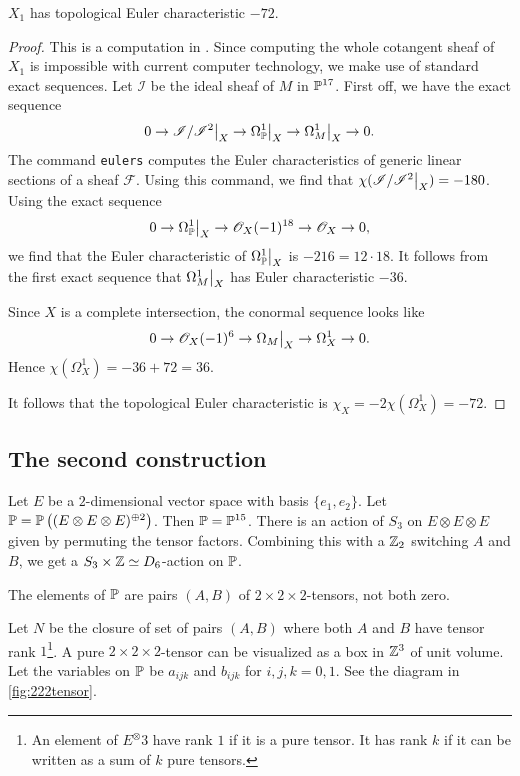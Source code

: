 \begin{proposition}
\label{prop:x1euler}
$X_1$ has topological Euler characteristic $-72$. 
\end{proposition}
\begin{proof}
This is a computation in \MM. Since computing the whole cotangent sheaf of $X_1$ is impossible with current computer technology, we make use of standard exact sequences. Let $\mathscr I$ be the ideal sheaf of $M$ in $\P^{17}$. First off, we have the exact sequence
$$
0 \to \restr{\mathscr I/\mathscr I^2}{X} \to \restr{\Omega_\P^1}{X} \to \restr{\Omega_M^1}{X} \to 0.
$$
The \MM command \texttt{eulers} computes the Euler characteristics of generic linear sections of a sheaf $\mathscr F$. Using this command, we find that $\chi(\restr{\mathscr I/\mathscr I^2}{X})=-180$. Using the exact sequence
$$
0 \to \restr{\Omega_\P^1}{X} \to \OO_X(-1)^{18} \to \OO_X \to 0,
$$
we find that the Euler characteristic of $\restr{\Omega_\P^1}{X}$ is $-216=12\cdot 18$. It follows from the first exact sequence that $\restr{\Omega_M^1}{X}$ has Euler characteristic $-36$.

Since $X$ is a complete intersection, the conormal sequence looks like
$$
0 \to \OO_X(-1)^6 \to \restr{\Omega_M}{X}  \to \Omega_X^1 \to 0.
$$
Hence $\chi(\Omega_X^1) = -36+72 = 36$.

It follows that the topological Euler characteristic is $\chi_X = -2\chi(\Omega_X^1)=-72$.
\end{proof}

\subsection{The second construction}

Let $E$ be a $2$-dimensional vector space with basis $\{e_1,e_2\}$. Let $\P=\P\left((E \otimes E \otimes E)^{\oplus 2}\right)$. Then $\P=\P^{15}$. There is an action of $S_3$ on $E \otimes E \otimes E$ given by permuting the tensor factors. Combining this with a $\Z_2$ switching $A$ and $B$, we get a $S_3 \times \Z \simeq D_6$-action on $\P$. 

The elements of $\P$ are pairs $(A,B)$ of $2 \times 2 \times 2$-tensors, not both zero. 

Let $N$ be the closure of set of pairs $(A,B)$ where both $A$ and $B$ have tensor rank $1$\footnote{An element of $E^\otimes 3$ have rank $1$ if it is a pure tensor. It has rank $k$ if it can be written as a sum of $k$ pure tensors.}. A pure $2 \times 2 \times 2$-tensor can be visualized as a box in $\Z^3$ of unit volume. Let the variables on $\P$ be $a_{ijk}$ and $b_{ijk}$ for $i,j,k=0,1$. See the diagram in \vref{fig:222tensor}.

